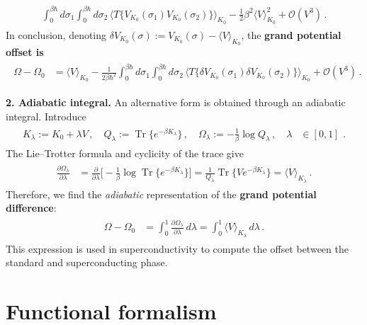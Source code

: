 \documentclass[../QFT_main.tex]{subfiles}
\begin{document}
\begin{mytheorem}
{\begin{align}
\begin{aligned}
        \int_0^{\beta\hbar}d\sigma_1
        \int_0^{\beta\hbar}d\sigma_2\,
        \Big\langle
            T\big\{
                V_{K_0}(\sigma_1)V_{K_0}(\sigma_2)
            \big\}
        \Big\rangle_{K_0}
    -\tfrac12\beta^2\langle V\rangle_{K_0}^2
    +\mathcal O(V^3)\,.
\end{aligned}\end{align}}
In conclusion, denoting $\delta V_{K_0}(\sigma):=V_{K_0}(\sigma)-\langle V\rangle_{K_0}$, the \textbf{grand potential offset is}
{\small\begin{align}\begin{aligned}
    \Omega-\Omega_0
    &=
    \langle V\rangle_{K_0}
    -\tfrac{1}{2\beta\hbar^2}
        \int_0^{\beta\hbar}d\sigma_1
        \int_0^{\beta\hbar}d\sigma_2\,
        \Big\langle
            T\big\{
                \delta V_{K_0}(\sigma_1)
                \delta V_{K_0}(\sigma_2)
            \big\}
        \Big\rangle_{K_0}
    +\mathcal O(V^3)\,.
\end{aligned}\end{align}}


\noindent
\textbf{2. Adiabatic integral.}
An alternative form is obtained through an adiabatic integral.
Introduce
{\small\begin{align}\begin{aligned}
    K_\lambda:=K_0+\lambda V\,,
    \quad 
    Q_\lambda:=\operatorname{Tr}\big\{e^{-\beta K_\lambda}\big\}\,,
    \quad
    \Omega_\lambda:=-\tfrac{1}{\beta}\log Q_\lambda\,,
    \quad 
    \lambda&\in[0,1]\,\,.
\end{aligned}\end{align}}
The Lie--Trotter formula and cyclicity of the trace give
{\small\begin{align}\begin{aligned}
    \tfrac{\partial\Omega_\lambda}{\partial\lambda}
    &=
    \tfrac{\partial}{\partial\lambda}
    \Big[
        -\tfrac{1}{\beta}
        \log\operatorname{Tr}\big\{e^{-\beta K_\lambda}\big\}
    \Big]
=
    \tfrac{1}{Q_\lambda}
    \operatorname{Tr}\big\{
        V e^{-\beta K_\lambda}
    \big\}
    =
    \langle V\rangle_{K_\lambda}\,.
\end{aligned}\end{align}}
Therefore, we find the \emph{adiabatic} representation of the \textbf{grand potential difference}:
{\small\begin{align}\begin{aligned}
    \Omega-\Omega_0
    &=
    \int_0^1
        \tfrac{\partial\Omega_\lambda}{\partial\lambda}\,d\lambda
    =
    \int_0^1
        \langle V\rangle_{K_\lambda}\,d\lambda\,.
\end{aligned}\end{align}}
This expression is used in superconductivity to compute the offset between the standard and superconducting phase.
\end{mytheorem}


\section{Functional formalism}
\end{document}
